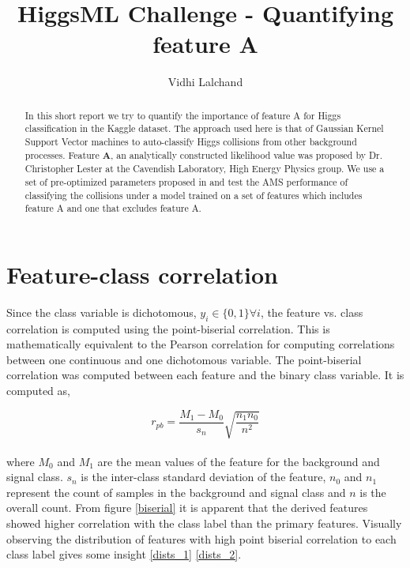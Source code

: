 \documentclass[final,3p,times,onecolumn]{elsarticle}
\begin{document}
\begin{frontmatter}
\begin{abstract}
In this short report we try to quantify the importance of feature A for Higgs classification in the Kaggle dataset. The approach used here is that of Gaussian Kernel Support Vector machines to auto-classify Higgs collisions from other background processes. Feature \textbf{A}, an analytically constructed likelihood value was proposed by Dr. Christopher Lester at the Cavendish Laboratory, High Energy Physics group. We use a set of pre-optimized parameters proposed in \cite{Vid} and test the AMS performance of classifying the collisions under a model trained on a set of features which includes feature A and one that excludes feature A.

\end{abstract}
\title{HiggsML Challenge - Quantifying feature A}
\author{Vidhi Lalchand}
\address{Cavendish Laboratory, Department of Physics, J J Thomson Avenue, Cambridge. CB3 0HE}
\end{frontmatter}

\section{Feature-class correlation}


Since the class variable is dichotomous, $y_{i} \in \{0,1\} \forall i$, the feature vs. class correlation is computed using the point-biserial correlation. This is mathematically equivalent to the Pearson correlation for computing correlations between one continuous and one dichotomous variable. The point-biserial correlation was computed between each feature and the binary class variable. It is computed as, 

\begin{equation}
r_{pb} = \dfrac{M_{1} - M_{0}}{s_{n}}\sqrt{\dfrac{n_{1}n_{0}}{n^2}}
\end{equation}
\\

where $M_{0}$ and $M_{1}$ are the mean values of the feature for the background and signal class. $s_{n}$ is the inter-class standard deviation of the feature, $n_{0}$ and $n_{1}$ represent the count of samples in the background and signal class and $n$ is the overall count. From figure \ref{biserial} it is apparent that the derived features showed higher correlation with the class label than the primary features. Visually observing the distribution of features with high point biserial correlation to each class label gives some insight \ref{dists_1} \ref{dists_2}. 
 
\end{document}
